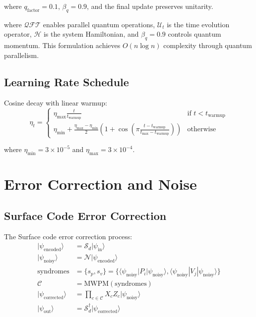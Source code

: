 \documentclass{article}
\begin{document}
where $q_{\text{factor}}=0.1$, $\beta_q=0.9$, and the final update preserves unitarity.

where $\mathcal{QFT}$ enables parallel quantum operations, $\mathcal{U}_t$ is the time evolution operator, $\mathcal{H}$ is the system Hamiltonian, and $\beta_q=0.9$ controls quantum momentum. This formulation achieves $O(n\log n)$ complexity through quantum parallelism.

\subsection{Learning Rate Schedule}
Cosine decay with linear warmup:
\begin{equation}
\eta_t = \begin{cases}
\eta_{\text{max}}\frac{t}{t_{\text{warmup}}} & \text{if } t < t_{\text{warmup}} \\
\eta_{\text{min}} + \frac{\eta_{\text{max}}-\eta_{\text{min}}}{2}(1 + \cos(\pi\frac{t-t_{\text{warmup}}}{t_{\text{max}}-t_{\text{warmup}}})) & \text{otherwise}
\end{cases}
\end{equation}

where $\eta_{\text{min}}=3\times10^{-5}$ and $\eta_{\text{max}}=3\times10^{-4}$.

\section{Error Correction and Noise}

\subsection{Surface Code Error Correction}
The Surface code error correction process:
\begin{align*}
|\psi_{\text{encoded}}\rangle &= \mathcal{S}_d|\psi_{\text{in}}\rangle \\
|\psi_{\text{noisy}}\rangle &= \mathcal{N}|\psi_{\text{encoded}}\rangle \\
\text{syndromes} &= \{s_p, s_v\} = \{\langle \psi_{\text{noisy}}|P_i|\psi_{\text{noisy}}\rangle, \langle \psi_{\text{noisy}}|V_j|\psi_{\text{noisy}}\rangle\} \\
\mathcal{C} &= \text{MWPM}(\text{syndromes}) \\
|\psi_{\text{corrected}}\rangle &= \prod_{c \in \mathcal{C}} X_c Z_c |\psi_{\text{noisy}}\rangle \\
|\psi_{\text{out}}\rangle &= \mathcal{S}_d^\dagger|\psi_{\text{corrected}}\rangle
\end{align*}
\end{document}
